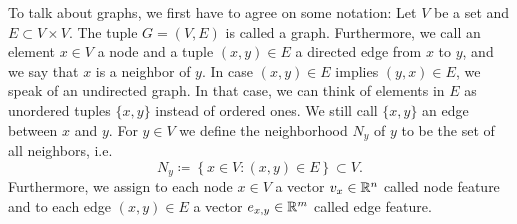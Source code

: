 To talk about graphs, we first have to agree on some notation: Let $V$ be a set and $E\subset V\times V$. The tuple $G=(V,E)$ is called a graph. Furthermore, we call an element $x\in V$ a node and a tuple 
$(x, y)\in E$ a directed edge from $x$ to $y$, and we say that $x$ is a neighbor of $y$. 
In case $(x,y)\in E$ implies $(y,x)\in E$, we speak of an undirected graph.
In that case, we can think of elements in $E$ as unordered tuples $\{x,y\}$ instead of ordered ones. We still call $\{x,y\}$ an edge between $x$ and $y$.
For $y\in V$ we define the neighborhood $N_y$ of $y$ to be the set of all neighbors, i.e.
\begin{equation}
    \label{eq:def_neighbors}
    N_y\coloneq\left\{x\in V : (x,y)\in E\right\}\subset V.
\end{equation}
Furthermore, we assign to each node $x\in V$ a vector $v_x\in\mathbb{R}^n$ called node feature and to each edge $(x, y)\in E$ a vector $e_{x,y}\in\mathbb{R}^m$ called edge feature. 


